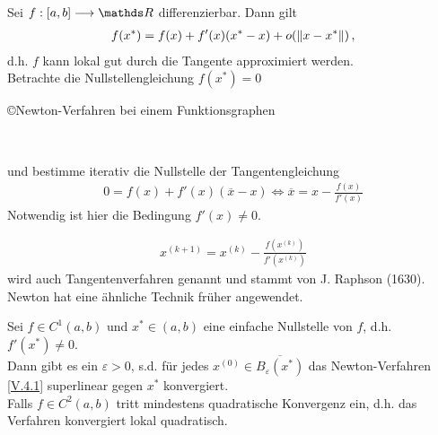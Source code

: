 
Sei $f:[a,b]\longrightarrow \R$ differenzierbar. Dann gilt
\begin{gather*}
  f(x^{*}) = f(x) + f'(x)(x^{*}-x)+o(\nn[x-x^{*}]) \, ,
\end{gather*} 
d.h. $f$ kann lokal gut durch die Tangente approximiert werden. \\
Betrachte die Nullstellengleichung $f(x^{*}) = 0$ \\

\begin{image}{\copyright Newton-Verfahren bei einem Funktionsgraphen}
  \\
\end{image}
\label{im5.4}

und bestimme iterativ die Nullstelle der Tangentengleichung
\begin{gather*}
  0=f(x) + f'(x)(\overline{x}-x) \Leftrightarrow \overline{x}= x-\frac{f(x)}{f'(x)}
\end{gather*}
Notwendig ist hier die Bedingung $f'(x) \neq 0$.


\begin{gather}
  x^{(k+1)} = x^{(k)} - \frac{f(x^{(k)})}{f'(x^{(k)})}
  \label{V.4.1}
\end{gather}
wird auch Tangentenverfahren genannt und stammt von
J. Raphson (1630). Newton hat eine ähnliche Technik früher angewendet.

\begin{Satze}
  \label{5.4.2}
  Sei $f\in C^1(a,b)$ und $x^{*}\in (a,b)$ eine einfache Nullstelle von $f$, d.h. $f'(x^{*})\neq 0$. \\
  Dann gibt es ein  $\varepsilon >0$, s.d. für jedes $x^{(0)}\in\overline{B_\varepsilon(x^{*})}$
  das Newton-Verfahren \eqref{V.4.1} superlinear gegen $x^{*}$ konvergiert.\\
  Falls $f\in C^2(a,b) $ tritt mindestens quadratische Konvergenz ein, d.h. das Verfahren
  konvergiert lokal quadratisch.
\end{Satze}

